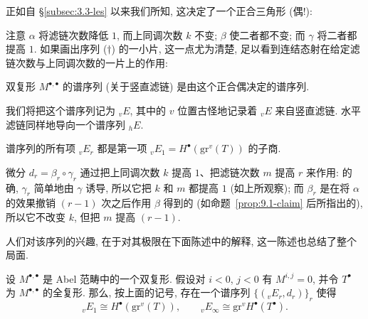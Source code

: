 正如自 \S\ref{subsec:3.3-les} 以来我们所知, 这决定了一个正合三角形 (偶!):
\begin{center}
\end{center}
注意 $\alpha$ 将滤链次数降低 $1$, 而上同调次数 $k$ 不变; $\beta$ 使二者都不变; 而 $\gamma$ 将二者都提高 $1$. 如果画出序列 ($\dagger$) 的一小片, 这一点尤为清楚, 足以看到连结态射在给定滤链次数与上同调次数的一片上的作用:
\begin{center}
\end{center}

\begin{definition}\label{def:9.3-ss-double-complex}
双复形 $M^{\bullet,\bullet}$ 的谱序列 (关于竖直滤链) 是由这个正合偶决定的谱序列.
\end{definition}

我们将把这个谱序列记为 ${}_vE$, 其中的 $v$ 位置古怪地记录着 ${}_vE$ 来自竖直滤链. 水平滤链同样地导向一个谱序列 ${}_hE$.

谱序列的所有项 ${}_vE_r$ 都是第一项 ${}_vE_1=H^\bullet(\mathrm{gr}^v(T))$ 的子商.

\begin{remark}\label{rmk:9.4-differential}
微分 $d_r=\beta_r\circ\gamma_r$ 通过把上同调次数 $k$ 提高 $1$、把滤链次数 $m$ 提高 $r$ 来作用: 的确, $\gamma_r$ 简单地由 $\gamma$ 诱导, 所以它把 $k$ 和 $m$ 都提高 $1$ (如上所观察); 而 $\beta_r$ 是在将 $\alpha$ 的效果撤销 $(r-1)$ 次之后作用 $\beta$ 得到的 (如命题~\ref{prop:9.1-claim} 后所指出的), 所以它不改变 $k$, 但把 $m$ 提高 $(r-1)$.
\end{remark}

人们对该序列的兴趣, 在于对其极限在下面陈述中的解释, 这一陈述也总结了整个局面.

\begin{theorem}\label{thm:9.5-total-complex}
设 $M^{\bullet,\bullet}$ 是 Abel 范畴中的一个双复形. 假设对 $i<0$, $j<0$ 有 $M^{i,j}=0$, 并令 $T^\bullet$ 为 $M^{\bullet,\bullet}$ 的全复形. 那么, 按上面的记号, 存在一个谱序列 $\{({}_vE_r,d_r)\}_r$ 使得
\[
{}_vE_1 \cong H^\bullet(\mathrm{gr}^v(T)),\qquad {}_vE_\infty \cong \mathrm{gr}^v H^\bullet(T^\bullet).
\]
\end{theorem}

